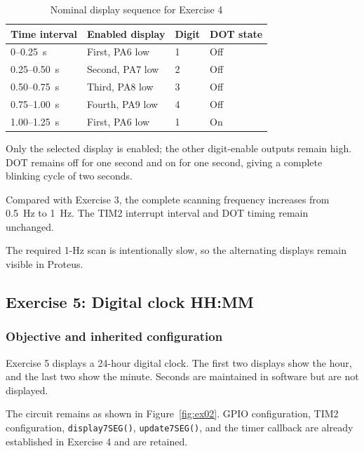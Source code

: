\documentclass[a4paper]{article}
\begin{document}
\begin{table}[H]
    \centering
    \caption{Nominal display sequence for Exercise 4}
    \label{tab:ex04-sequence}
    \begin{tabular}{llll}
        \toprule
        \textbf{Time interval} &
        \textbf{Enabled display} &
        \textbf{Digit} &
        \textbf{DOT state} \\
        \midrule
        0--0.25~s    & First, PA6 low  & 1 & Off \\
        0.25--0.50~s & Second, PA7 low & 2 & Off \\
        0.50--0.75~s & Third, PA8 low  & 3 & Off \\
        0.75--1.00~s & Fourth, PA9 low & 4 & Off \\
        1.00--1.25~s & First, PA6 low  & 1 & On \\
        \bottomrule
    \end{tabular}
\end{table}

Only the selected display is enabled; the other
digit-enable outputs remain high. DOT remains
off for one second and on for one second,
giving a complete blinking cycle of two seconds.

Compared with Exercise 3, the complete scanning
frequency increases from 0.5~Hz to 1~Hz.
The TIM2 interrupt interval and DOT timing
remain unchanged.

The required 1-Hz scan is intentionally slow,
so the alternating displays remain visible
in Proteus.
\subsection{Exercise 5: Digital clock HH:MM}

\subsubsection{Objective and inherited configuration}

Exercise 5 displays a 24-hour digital clock.
The first two displays show the hour, and the
last two show the minute. Seconds are maintained
in software but are not displayed.

The circuit remains as shown in Figure~\ref{fig:ex02}.
GPIO configuration, TIM2 configuration,
\texttt{display7SEG()}, \texttt{update7SEG()},
and the timer callback are already established
in Exercise 4 and are retained.
\end{document}
